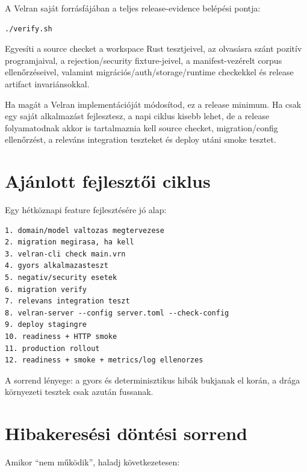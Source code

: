 A Velran saját forrásfájában a teljes release-evidence belépési pontja:

\begin{lstlisting}
./verify.sh
\end{lstlisting}

Egyesíti a source checket a workspace Rust tesztjeivel, az  olvasásra szánt pozitív programjaival, a  rejection/security fixture-jeivel, a  manifest-vezérelt corpus ellenőrzéseivel, valamint migrációs/auth/storage/runtime checkekkel és release artifact invariánsokkal.

Ha magát a Velran implementációját módosítod, ez a release minimum. Ha csak egy saját  alkalmazást fejlesztesz, a napi ciklus kisebb lehet, de a release folyamatodnak akkor is tartalmaznia kell source checket, migration/config ellenőrzést, a releváns integration teszteket és deploy utáni smoke tesztet.

\section{Ajánlott fejlesztői ciklus}

Egy hétköznapi feature fejlesztésére jó alap:

\begin{lstlisting}
1. domain/model valtozas megtervezese
2. migration megirasa, ha kell
3. velran-cli check main.vrn
4. gyors alkalmazasteszt
5. negativ/security esetek
6. migration verify
7. relevans integration teszt
8. velran-server --config server.toml --check-config
9. deploy stagingre
10. readiness + HTTP smoke
11. production rollout
12. readiness + smoke + metrics/log ellenorzes
\end{lstlisting}

A sorrend lényege: a gyors és determinisztikus hibák bukjanak el korán, a drága környezeti tesztek csak azután fussanak.

\section{Hibakeresési döntési sorrend}

Amikor ``nem működik'', haladj következetesen:

